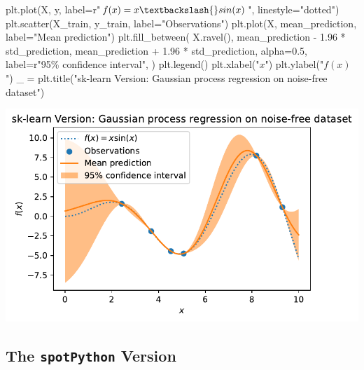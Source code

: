 \documentclass[
  letterpaper,
  DIV=11,
  numbers=noendperiod]{scrreprt}
\newenvironment{Shaded}{\begin{snugshade}}{\end{snugshade}}
\newcommand{\FloatTok}[1]{\textcolor[rgb]{0.68,0.00,0.00}{#1}}
\newcommand{\NormalTok}[1]{\textcolor[rgb]{0.00,0.23,0.31}{#1}}
\newcommand{\OperatorTok}[1]{\textcolor[rgb]{0.37,0.37,0.37}{#1}}
\newcommand{\SpecialCharTok}[1]{\textcolor[rgb]{0.37,0.37,0.37}{#1}}
\newcommand{\StringTok}[1]{\textcolor[rgb]{0.13,0.47,0.30}{#1}}
\newcommand{\VerbatimStringTok}[1]{\textcolor[rgb]{0.13,0.47,0.30}{#1}}
\begin{document}
\begin{Shaded}
\begin{Highlighting}[]
\NormalTok{plt.plot(X, y, label}\OperatorTok{=}\VerbatimStringTok{r"$f(x) = x \textbackslash{}sin(x)$"}\NormalTok{, linestyle}\OperatorTok{=}\StringTok{"dotted"}\NormalTok{)}
\NormalTok{plt.scatter(X\_train, y\_train, label}\OperatorTok{=}\StringTok{"Observations"}\NormalTok{)}
\NormalTok{plt.plot(X, mean\_prediction, label}\OperatorTok{=}\StringTok{"Mean prediction"}\NormalTok{)}
\NormalTok{plt.fill\_between(}
\NormalTok{    X.ravel(),}
\NormalTok{    mean\_prediction }\OperatorTok{{-}} \FloatTok{1.96} \OperatorTok{*}\NormalTok{ std\_prediction,}
\NormalTok{    mean\_prediction }\OperatorTok{+} \FloatTok{1.96} \OperatorTok{*}\NormalTok{ std\_prediction,}
\NormalTok{    alpha}\OperatorTok{=}\FloatTok{0.5}\NormalTok{,}
\NormalTok{    label}\OperatorTok{=}\VerbatimStringTok{r"95}\SpecialCharTok{\% c}\VerbatimStringTok{onfidence interval"}\NormalTok{,}
\NormalTok{)}
\NormalTok{plt.legend()}
\NormalTok{plt.xlabel(}\StringTok{"$x$"}\NormalTok{)}
\NormalTok{plt.ylabel(}\StringTok{"$f(x)$"}\NormalTok{)}
\NormalTok{\_ }\OperatorTok{=}\NormalTok{ plt.title(}\StringTok{"sk{-}learn Version: Gaussian process regression on noise{-}free dataset"}\NormalTok{)}
\end{Highlighting}
\end{Shaded}

\includegraphics{011_num_spot_sklearn_gaussian_files/figure-pdf/cell-5-output-1.pdf}

\subsection{\texorpdfstring{The \texttt{spotPython}
Version}{The spotPython Version}}\label{the-spotpython-version}
\end{document}
